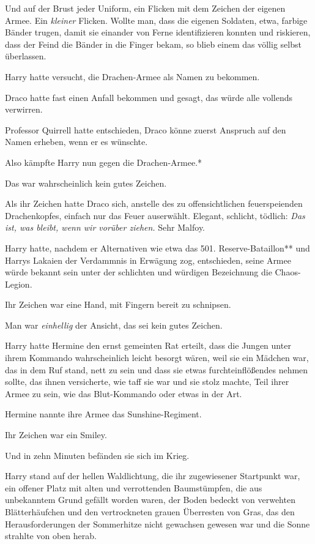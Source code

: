 {Und auf der Brust jeder Uniform, ein Flicken mit dem Zeichen der eigenen Armee. Ein \emph{kleiner} Flicken. Wollte man, dass die eigenen Soldaten, etwa, farbige Bänder trugen, damit sie einander von Ferne identifizieren konnten und riskieren, dass der Feind die Bänder in die Finger bekam, so blieb einem das völlig selbst überlassen.

Harry hatte versucht, die Drachen-Armee als Namen zu bekommen.

Draco hatte fast einen Anfall bekommen und gesagt, das würde alle vollends verwirren.

Professor Quirrell hatte entschieden, Draco könne zuerst Anspruch auf den Namen erheben, wenn er es wünschte.

Also kämpfte Harry nun gegen die Drachen-Armee.*

Das war wahrscheinlich kein gutes Zeichen.

Als ihr Zeichen hatte Draco sich, anstelle des zu offensichtlichen feuerspeienden Drachenkopfes, einfach nur das Feuer auserwählt. Elegant, schlicht, tödlich: \emph{Das ist, was bleibt, wenn wir vorüber ziehen.} Sehr Malfoy.

Harry hatte, nachdem er Alternativen wie etwa das 501. Reserve-Bataillon** und Harrys Lakaien der Verdammnis in Erwägung zog, entschieden, seine Armee würde bekannt sein unter der schlichten und würdigen Bezeichnung die Chaos-Legion.

Ihr Zeichen war eine Hand, mit Fingern bereit zu schnipsen.

Man war \emph{einhellig} der Ansicht, das sei kein gutes Zeichen.

Harry hatte Hermine den ernst gemeinten Rat erteilt, dass die Jungen unter ihrem Kommando wahrscheinlich leicht besorgt wären, weil sie ein Mädchen war, das in dem Ruf stand, nett zu sein und dass sie etwas furchteinflößendes nehmen sollte, das ihnen versicherte, wie taff sie war und sie stolz machte, Teil ihrer Armee zu sein, wie das Blut-Kommando oder etwas in der Art.

Hermine nannte ihre Armee das Sunshine-Regiment.

Ihr Zeichen war ein Smiley.

Und in zehn Minuten befänden sie sich im Krieg.

Harry stand auf der hellen Waldlichtung, die ihr zugewiesener Startpunkt war, ein offener Platz mit alten und verrottenden Baumstümpfen, die aus unbekanntem Grund gefällt worden waren, der Boden bedeckt von verwehten Blätterhäufchen und den vertrockneten grauen Überresten von Gras, das den Herausforderungen der Sommerhitze nicht gewachsen gewesen war und die Sonne strahlte von oben herab.

}
